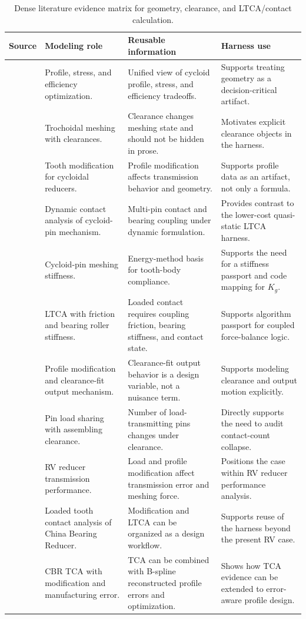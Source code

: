 \documentclass{article}
\begin{document}
\begin{table}[t]
\caption{Dense literature evidence matrix for geometry, clearance, and LTCA/contact calculation.}
\centering
\small
\begin{tabular}{p{2.7cm}p{3.0cm}p{3.7cm}p{3.8cm}}
\toprule
\textbf{Source} & \textbf{Modeling role} & \textbf{Reusable information} & \textbf{Harness use} \\
\midrule
\citet{sensinger2010optimization} & Profile, stress, and efficiency optimization. & Unified view of cycloid profile, stress, and efficiency tradeoffs. & Supports treating geometry as a decision-critical artifact. \\
\citet{ivanovic2012clearances} & Trochoidal meshing with clearances. & Clearance changes meshing state and should not be hidden in prose. & Motivates explicit clearance objects in the harness. \\
\citet{lin2014twostage} & Tooth modification for cycloidal reducers. & Profile modification affects transmission behavior and geometry. & Supports profile data as an artifact, not only a formula. \\
\citet{xu2016dynamic} & Dynamic contact analysis of cycloid-pin mechanism. & Multi-pin contact and bearing coupling under dynamic formulation. & Provides contrast to the lower-cost quasi-static LTCA harness. \\
\citet{yang2018stiffness} & Cycloid-pin meshing stiffness. & Energy-method basis for tooth-body compliance. & Supports the need for a stiffness passport and code mapping for $K_g$. \\
\citet{tsai2017ltca} & LTCA with friction and bearing roller stiffness. & Loaded contact requires coupling friction, bearing stiffness, and contact state. & Supports algorithm passport for coupled force-balance logic. \\
\citet{li2017clearancefit} & Profile modification and clearance-fit output mechanism. & Clearance-fit output behavior is a design variable, not a nuisance term. & Supports modeling clearance and output motion explicitly. \\
\citet{xu2019assembling} & Pin load sharing with assembling clearance. & Number of load-transmitting pins changes under clearance. & Directly supports the need to audit contact-count collapse. \\
\citet{wang2019transmission} & RV reducer transmission performance. & Load and profile modification affect transmission error and meshing force. & Positions the case within RV reducer performance analysis. \\
\citet{sun2019cbr} & Loaded tooth contact analysis of China Bearing Reducer. & Modification and LTCA can be organized as a design workflow. & Supports reuse of the harness beyond the present RV case. \\
\citet{sun2024cbrtca} & CBR TCA with modification and manufacturing error. & TCA can be combined with B-spline reconstructed profile errors and optimization. & Shows how TCA evidence can be extended to error-aware profile design. \\
\bottomrule
\end{tabular}
\label{tab:literature_matrix}
\end{table}
\end{document}

